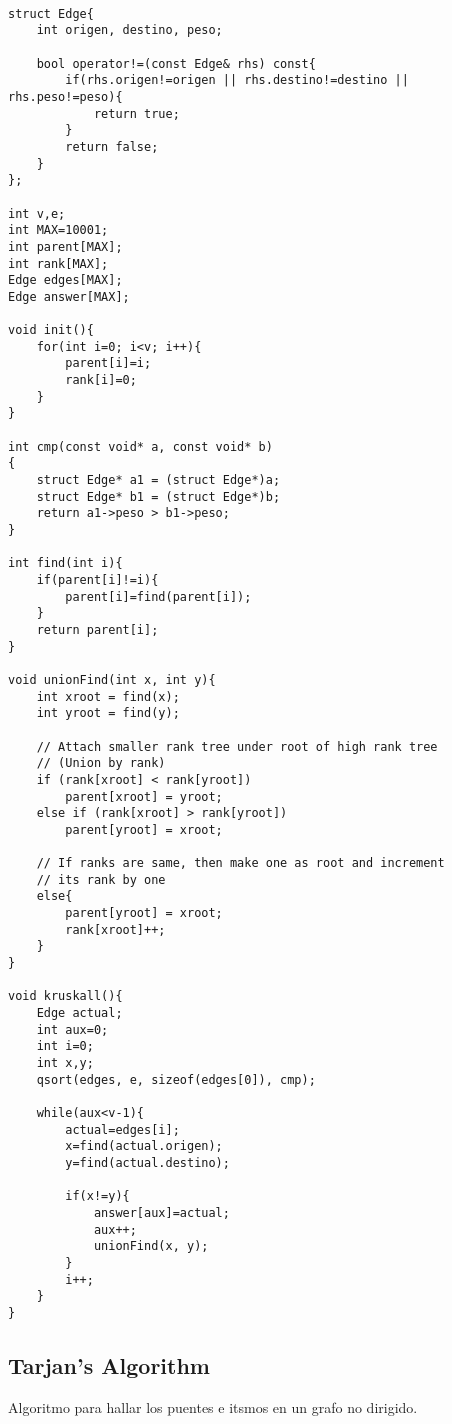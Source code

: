 \documentclass[11pt,letterpaper,twocolumn,twosided]{article}
\begin{document}
\begin{lstlisting}

struct Edge{
    int origen, destino, peso;

    bool operator!=(const Edge& rhs) const{
        if(rhs.origen!=origen || rhs.destino!=destino || rhs.peso!=peso){
            return true;
        }
        return false;
    }
};

int v,e;
int MAX=10001;
int parent[MAX];
int rank[MAX]; 
Edge edges[MAX];
Edge answer[MAX];

void init(){
    for(int i=0; i<v; i++){
        parent[i]=i;
        rank[i]=0;
    }
}

int cmp(const void* a, const void* b)
{   
    struct Edge* a1 = (struct Edge*)a;
    struct Edge* b1 = (struct Edge*)b;
    return a1->peso > b1->peso;
}

int find(int i){
    if(parent[i]!=i){
        parent[i]=find(parent[i]);
    }
    return parent[i];
}

void unionFind(int x, int y){
    int xroot = find(x);
    int yroot = find(y);
 
    // Attach smaller rank tree under root of high rank tree
    // (Union by rank)
    if (rank[xroot] < rank[yroot])
        parent[xroot] = yroot;
    else if (rank[xroot] > rank[yroot])
        parent[yroot] = xroot;
 
    // If ranks are same, then make one as root and increment
    // its rank by one
    else{
        parent[yroot] = xroot;
        rank[xroot]++;
    }
}

void kruskall(){
    Edge actual;
    int aux=0;
    int i=0;
    int x,y;
    qsort(edges, e, sizeof(edges[0]), cmp);

    while(aux<v-1){
        actual=edges[i];
        x=find(actual.origen);
        y=find(actual.destino);

        if(x!=y){
            answer[aux]=actual;
            aux++;
            unionFind(x, y);
        }
        i++;
    }
}
\end{lstlisting}

\subsection{Tarjan's Algorithm}
Algoritmo para hallar los puentes e itsmos en un grafo no dirigido.
\end{document}
